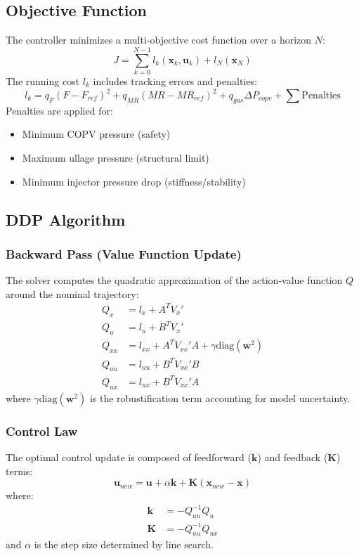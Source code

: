 \subsection{Objective Function}
The controller minimizes a multi-objective cost function over a horizon $N$:
\begin{equation}
J = \sum_{k=0}^{N-1} l_k(\mathbf{x}_k, \mathbf{u}_k) + l_N(\mathbf{x}_N)
\end{equation}
The running cost $l_k$ includes tracking errors and penalties:
\begin{equation}
l_k = q_F(F - F_{ref})^2 + q_{MR}(MR - MR_{ref})^2 + q_{gas}\Delta P_{copv} + \sum \text{Penalties}
\end{equation}
Penalties are applied for:
\begin{itemize}
    \item Minimum COPV pressure (safety)
    \item Maximum ullage pressure (structural limit)
    \item Minimum injector pressure drop (stiffness/stability)
\end{itemize}

\subsection{DDP Algorithm}

\subsubsection{Backward Pass (Value Function Update)}
The solver computes the quadratic approximation of the action-value function $Q$ around the nominal trajectory:
\begin{align}
Q_x &= l_x + A^T V_x' \\
Q_u &= l_u + B^T V_x' \\
Q_{xx} &= l_{xx} + A^T V_{xx}' A + \gamma \text{diag}(\mathbf{w}^2) \\
Q_{uu} &= l_{uu} + B^T V_{xx}' B \\
Q_{ux} &= l_{ux} + B^T V_{xx}' A
\end{align}
where $\gamma \text{diag}(\mathbf{w}^2)$ is the robustification term accounting for model uncertainty.

\subsubsection{Control Law}
The optimal control update is composed of feedforward ($\mathbf{k}$) and feedback ($\mathbf{K}$) terms:
\begin{equation}
\mathbf{u}_{new} = \mathbf{u} + \alpha \mathbf{k} + \mathbf{K}(\mathbf{x}_{new} - \mathbf{x})
\end{equation}
where:
\begin{align}
\mathbf{k} &= -Q_{uu}^{-1} Q_u \\
\mathbf{K} &= -Q_{uu}^{-1} Q_{ux}
\end{align}
and $\alpha$ is the step size determined by line search.

